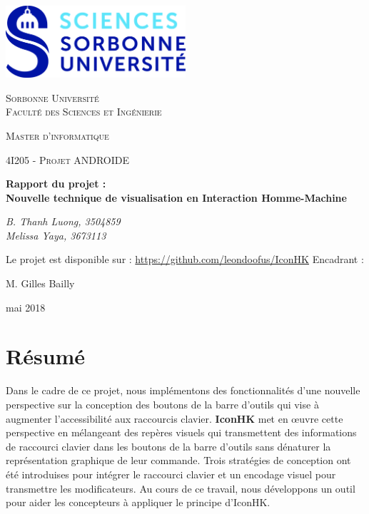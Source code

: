 \documentclass[12pt,a4paper]{article}
\begin{document}
\begin{titlepage}
	\centering
	\includegraphics[width=0.5\textwidth]{SU.jpg}\par\vspace{1cm}
	{\scshape\LARGE Sorbonne Université\\ Faculté des Sciences et Ingénierie \par}
	\vspace{1cm}
	{\scshape\large Master d'informatique \par}
	\vspace{1cm}
	{\scshape\Large 4I205 - Projet ANDROIDE\par}
	\vspace{1.5cm}
	{\huge\bfseries Rapport du projet :\\
		Nouvelle technique de visualisation en Interaction Homme-Machine\par}
	\vspace{2cm}
	{\Large\itshape B. Thanh Luong, 3504859 \\      Melissa Yaya, 3673113\par}
	\vspace{1cm}
	{Le projet est disponible sur : \href{https://github.com/leondoofus/IconHK}{https://github.com/leondoofus/IconHK}}
	\vfill
	Encadrant :\par
	M. Gilles Bailly
	\vfill

	{\large mai 2018\par}
\end{titlepage}
\newpage
\tableofcontents
\newpage
\section{Résumé}
Dans le cadre de ce projet, nous implémentons des fonctionnalités d'une nouvelle perspective sur la conception des boutons de la barre d'outils qui vise
à augmenter l'accessibilité aux raccourcis clavier. \textbf{IconHK} met en œuvre cette perspective en mélangeant des repères visuels qui transmettent des informations de raccourci clavier dans les boutons de la barre d'outils sans dénaturer la représentation graphique de leur commande. Trois stratégies de conception ont été introduises pour intégrer le raccourci clavier et un encodage visuel
pour transmettre les modificateurs. Au cours de ce travail, nous développons un outil pour aider les concepteurs à appliquer le principe d'IconHK.
\end{document}

